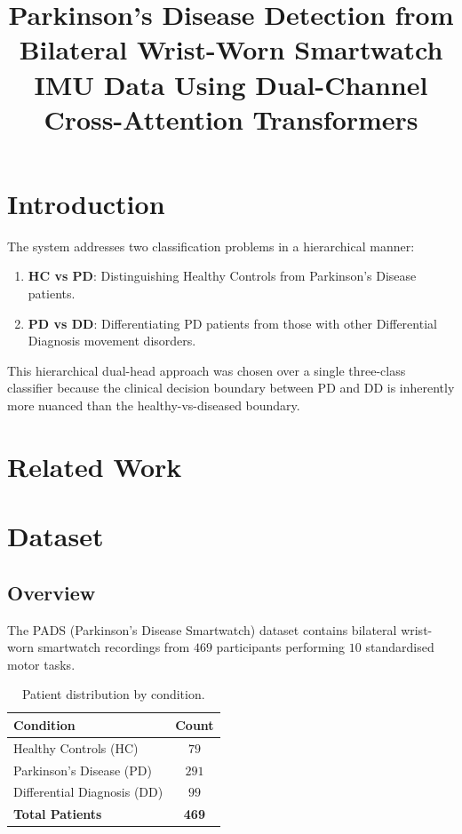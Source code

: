 \documentclass[conference]{IEEEtran}
\title{Parkinson's Disease Detection from Bilateral Wrist-Worn Smartwatch IMU Data Using Dual-Channel Cross-Attention Transformers}
\author{
  \IEEEauthorblockN{Author Name}
  \IEEEauthorblockA{\\\
  University Name \\
  \texttt{author@email.edu}}
}
\begin{document}
\maketitle

\begin{abstract}

\end{abstract}

\section{Introduction}



The system addresses two classification problems in a hierarchical manner:
\begin{enumerate}[noitemsep]
  \item \textbf{HC vs PD}: Distinguishing Healthy Controls from Parkinson's Disease patients.
  \item \textbf{PD vs DD}: Differentiating PD patients from those with other Differential Diagnosis movement disorders.
\end{enumerate}

This hierarchical dual-head approach was chosen over a single three-class classifier because the clinical decision boundary between PD and DD is inherently more nuanced than the healthy-vs-diseased boundary.

\section{Related Work}

\section{Dataset}

\subsection{Overview}
The PADS (Parkinson's Disease Smartwatch) dataset contains bilateral wrist-worn smartwatch recordings from $469$ participants performing $10$ standardised motor tasks.

\begin{table}[H]
\centering
\caption{Patient distribution by condition.}
\label{tab:patients}
\begin{tabular}{lc}
\toprule
\textbf{Condition} & \textbf{Count} \\
\midrule
Healthy Controls (HC)        & $79$  \\
Parkinson's Disease (PD)     & $291$ \\
Differential Diagnosis (DD)  & $99$  \\
\midrule
\textbf{Total Patients}      & \textbf{469} \\
\bottomrule
\end{tabular}
\end{table}
\end{document}
